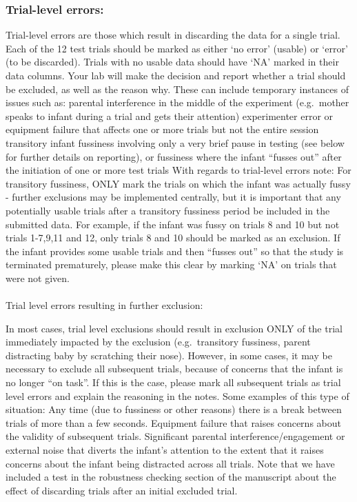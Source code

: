 \documentclass[
  letterpaper,
  DIV=11,
  numbers=noendperiod,
  oneside]{scrreprt}
\makeatletter
\let\oldparagraph\paragraph
\renewcommand{\paragraph}{
    \@ifstar
      \xxxParagraphStar
      \xxxParagraphNoStar
  }
\newcommand{\xxxParagraphStar}[1]{\oldparagraph*{#1}\mbox{}}
\newcommand{\xxxParagraphNoStar}[1]{\oldparagraph{#1}\mbox{}}
\makeatother
\begin{document}
\subsubsection{Trial-level errors:}\label{trial-level-errors}

Trial-level errors are those which result in discarding the data for a
single trial. Each of the 12 test trials should be marked as either `no
error' (usable) or `error' (to be discarded). Trials with no usable data
should have `NA' marked in their data columns. Your lab will make the
decision and report whether a trial should be excluded, as well as the
reason why. These can include temporary instances of issues such as:
parental interference in the middle of the experiment (e.g.~mother
speaks to infant during a trial and gets their attention) experimenter
error or equipment failure that affects one or more trials but not the
entire session transitory infant fussiness involving only a very brief
pause in testing (see below for further details on reporting), or
fussiness where the infant ``fusses out'' after the initiation of one or
more test trials With regards to trial-level errors note: For transitory
fussiness, ONLY mark the trials on which the infant was actually fussy -
further exclusions may be implemented centrally, but it is important
that any potentially usable trials after a transitory fussiness period
be included in the submitted data. For example, if the infant was fussy
on trials 8 and 10 but not trials 1-7,9,11 and 12, only trials 8 and 10
should be marked as an exclusion. If the infant provides some usable
trials and then ``fusses out'' so that the study is terminated
prematurely, please make this clear by marking `NA' on trials that were
not given.

\paragraph{Trial level errors resulting in further
exclusion:}\label{trial-level-errors-resulting-in-further-exclusion}

In most cases, trial level exclusions should result in exclusion ONLY of
the trial immediately impacted by the exclusion (e.g.~transitory
fussiness, parent distracting baby by scratching their nose). However,
in some cases, it may be necessary to exclude all subsequent trials,
because of concerns that the infant is no longer ``on task''. If this is
the case, please mark all subsequent trials as trial level errors and
explain the reasoning in the notes. Some examples of this type of
situation: Any time (due to fussiness or other reasons) there is a break
between trials of more than a few seconds. Equipment failure that raises
concerns about the validity of subsequent trials. Significant parental
interference/engagement or external noise that diverts the infant's
attention to the extent that it raises concerns about the infant being
distracted across all trials. Note that we have included a test in the
robustness checking section of the manuscript about the effect of
discarding trials after an initial excluded trial.
\end{document}
